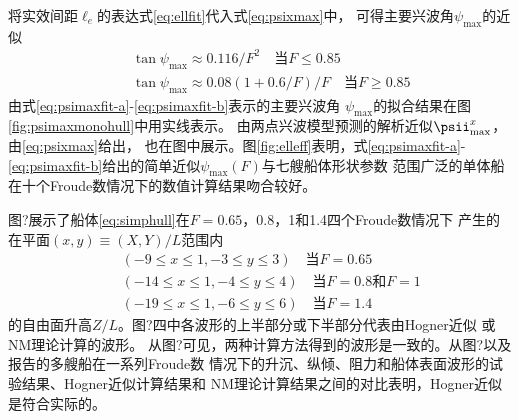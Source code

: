 将实效间距$\ell_e$的表达式\eqref{eq:ellfit}代入式\eqref{eq:psixmax}中，
可得主要兴波角$\psi_{\max}$的近似
\begin{subequations}
  \label{eq:psimaxfit}
  \begin{eqnarray}
    &&\tan\psi_{\max}\approx 0.116/F^2\quad\text{当}F\le0.85
    \label{eq:psimaxfit-a}\\
    &&\tan\psi_{\max}\approx 0.08(1+0.6/F)/F\quad\text{当}F\ge0.85
    \label{eq:psimaxfit-b}
  \end{eqnarray}
\end{subequations}
由式\eqref{eq:psimaxfit-a}-\eqref{eq:psimaxfit-b}表示的主要兴波角
$\psi_{\max}$的拟合结果在图\ref{fig:psimaxmonohull}中用实线表示。
由两点兴波模型预测的解析近似$\psii^x_{\max}$，由\eqref{eq:psixmax}给出，
也在图中展示。图\ref{fig:elleff}表明，式\eqref{eq:psimaxfit-a}-
\eqref{eq:psimaxfit-b}给出的简单近似$\psi_{\max}(F)$与七艘船体形状参数
范围广泛的单体船在十个Froude数情况下的数值计算结果吻合较好。

图?展示了船体\eqref{eq:simphull}在$F=0.65$，0.8，1和1.4四个Froude数情况下
产生的在平面$(x,y)\equiv(X,Y)/L$范围内
\begin{eqnarray*}
  &&(-9\le x\le 1,-3\le y\le3)\quad\text{当}F=0.65\\
  &&(-14\le x\le1,-4\le y\le4)\quad\text{当}F=0.8\text{和}F=1\\
  &&(-19\le x\le1,-6\le y\le6)\quad\text{当}F=1.4
\end{eqnarray*}
的自由面升高$Z/L$。图?四中各波形的上半部分或下半部分代表由Hogner近似
\supercite{Hogner1932Hydromech}或NM理论\supercite{Noblesse2014Why}计算的波形。
从图?可见，两种计算方法得到的波形是一致的。从图?以及
\parencite{Noblesse2013Neumann,Huang2013Numerical}报告的多艘船在一系列Froude数
情况下的升沉、纵倾、阻力和船体表面波形的试验结果、Hogner近似计算结果和
NM理论计算结果之间的对比表明，Hogner近似是符合实际的。

